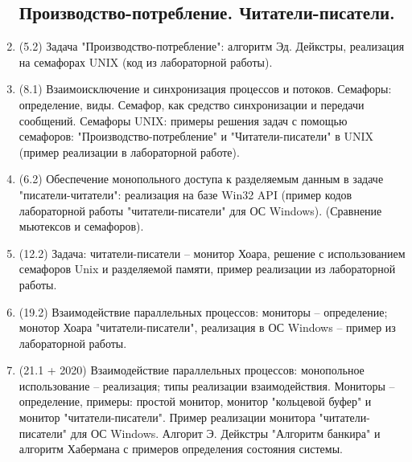 \documentclass[a4paper,14pt]{extreport}
\begin{document}
\begin{enumerate}
\subsection{Производство-потребление. Читатели-писатели.}
    \item (5.2) Задача "Производство-потребление": алгоритм Эд. Дейкстры,
        реализация на семафорах UNIX (код из лабораторной работы).
    \item (8.1) Взаимоисключение и синхронизация процессов и потоков.
        Семафоры: определение, виды. Семафор, как средство синхронизации и
        передачи сообщений. Семафоры UNIX: примеры решения задач с помощью
        семафоров: "Производство-потребление" и "Читатели-писатели" в UNIX
        (пример реализации в лабораторной работе).
    \item (6.2) Обеспечение монопольного доступа к разделяемым данным в
        задаче "писатели-читатели": реализация на базе Win32 API
        (пример кодов лабораторной работы "читатели-писатели" для ОС
        Windows). (Сравнение мьютексов и семафоров).
    \item (12.2) Задача: читатели-писатели -- монитор Хоара, решение с
        использованием семафоров Unix и разделяемой памяти, пример
        реализации из лабораторной работы.
    \item (19.2) Взаимодействие параллельных процессов: мониторы --
        определение; монотор Хоара "читатели-писатели", реализация в ОС Windows
        -- пример из лабораторной работы.
    \item (21.1 + 2020) Взаимодействие параллельных процессов: монопольное
        использование -- реализация; типы реализации взаимодействия.
        Мониторы -- определение, примеры: простой монитор, монитор
        "кольцевой буфер" и монитор "читатели-писатели". Пример реализации
        монитора "читатели-писатели" для ОС Windows. Алгорит Э. Дейкстры
        "Алгоритм банкира" и алгоритм Хабермана с примеров определения
        состояния системы.


\end{enumerate}
\end{document}
